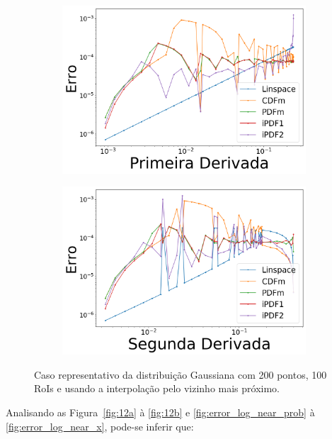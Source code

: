 \begin{figure}[H]
	\begin{subfigure}[b]{0.45\textwidth}
		\centering 
		\includegraphics[width=\textwidth]{./figuras/error_normal_nearest_Primeira_Derivada_1.png}
		\caption{}
		\label{fig:12c}
	\end{subfigure}
	\hfill
	\begin{subfigure}[b]{0.45\textwidth}
		\centering 
		\includegraphics[width=\textwidth]{./figuras/error_normal_nearest_Segunda_Derivada_1.png}
		\caption{}
		\label{fig:12d}
	\end{subfigure}
	\caption{Caso representativo da distribuição Gaussiana com 200 pontos, 100 RoIs e usando a interpolação pelo vizinho mais próximo.}
	\label{fig:12}
\end{figure}

Analisando as Figura~\ref{fig:12a} à \ref{fig:12b} e \ref{fig:error_log_near_prob} à \ref{fig:error_log_near_x}, pode-se inferir que:

